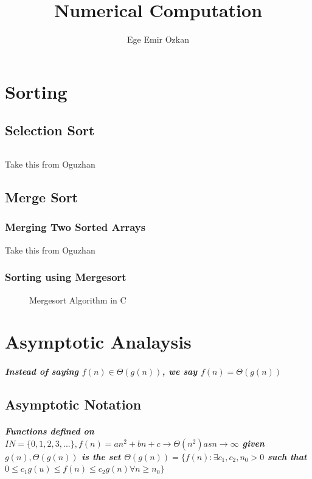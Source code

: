 \documentclass[11pt]{book}
\title{\textbf{Numerical Computation}}
\author{Ege Emir Ozkan}
\date{}
\begin{document}
\maketitle
\chapter{Sorting}

\section{Selection Sort}

\[
\]

Take this from Oguzhan

\section{Merge Sort}

\subsection{Merging Two Sorted Arrays}
Take this from Oguzhan

\subsection{Sorting using Mergesort}

\begin{figure}
\caption{Mergesort Algorithm in C}

\end{figure}
\chapter{Asymptotic Analaysis}

\paragraph{Instead of saying $f(n) \in \Theta(g(n))$, we say $f(n) = \Theta(g(n))$}
\section{Asymptotic Notation}

\paragraph{Functions defined on $IN = \{0, 1, 2, 3, ...\}, f(n) = an^2 + bn + c \rightarrow \Theta(n^2) as n \rightarrow \infty$ given $ g(n), \Theta(g(n))$ is the set $\Theta(g(n)) = \{f(n): \exists c_1, c_2, n_0 > 0$ such that $0 \leq c_1 g(u) \leq f(n) \leq c_2 g(n) \forall n \geq n_0\}$}
\end{document}
